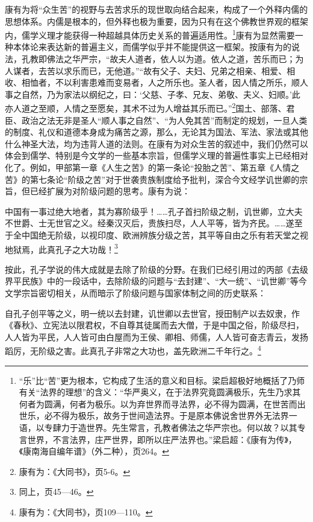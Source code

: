 \documentclass[a4paper, 12pt, openright]{ctexbook}
\renewenvironment{quote}
  {\list{}{\rightmargin2\ccwd \leftmargin2\ccwd \itemindent=2\ccwd \listparindent=2\ccwd}%
   \item\relax\small\kaishu\color{black}}
  {\endlist}
\begin{document}
康有为将“众生苦”的视野与去苦求乐的现世取向结合起来，构成了一个外释内儒的思想体系。内儒是根本的，但外释也极为重要，因为只有在这个佛教世界观的框架内，儒学义理才能获得一种超越具体历史关系的普遍适用性。\footnote{“乐”比“苦”更为根本，它构成了生活的意义和目标。梁启超极好地概括了乃师有关“法界的理想”的含义：“华严奥义，在于法界究竟圆满极乐，先生乃求其何者为圆满，何者为极乐。以为弃世界而寻法界，必不得为圆满，在世苦而出世乐，必不得为极乐，故务于世间造法界。于是原本佛说舍世界外无法界一语，以专肆力于造世界。先生常言，孔教者佛法之华严宗也。何以故？以其专言世界，不言法界，庄严世界，即所以庄严法界也。”梁启超：《康有为传》，《康南海自编年谱》（外二种），页264。}康有为显然需要一种本体论来表达新的普遍主义，而儒学似乎并不能提供这一框架。按康有为的说法，孔教即佛法之华严宗，“故夫人道者，依人以为道。依人之道，苦乐而已；为人谋者，去苦以求乐而已，无他道。”“故有父子、夫妇、兄弟之相亲、相爱、相收、相恤者，不以利害患难而变易者，人之所乐也。圣人者，因人情之所乐，顺人事之自然，乃为家法以纲纪之，曰：‘父慈、子孝、兄友、弟敬、夫义、妇顺。’此亦人道之至顺，人情之至愿矣，其术不过为人增益其乐而已。”\footnote{康有为：《大同书》，页5-6。}国土、部落、君臣、政治之法无非是圣人“顺人事之自然”、“为人免其苦”而制定的规划，一旦人类的制度、礼仪和道德本身成为痛苦之源，那么，无论其为国法、军法、家法或其他什么神圣大法，均为违背人道的法则。在康有为对众生苦的叙述中，我们仍然可以体会到儒学、特别是今文学的一些基本宗旨，但儒学义理的普遍性事实上已经相对化了。例如，甲部第一章《人生之苦》的第一条论“投胎之苦”、第五章《人情之苦》的第七条论“阶级之苦”对于世袭贵族制度给予批判，深合今文经学讥世卿的宗旨，但已经扩展为对阶级问题的思考。康有为说：

\begin{quote}
中国有一事过绝大地者，其为寡阶级乎！……孔子首扫阶级之制，讥世卿，立大夫不世爵、士无世官之义。经秦汉灭后，贵族扫尽，人人平等，皆为齐民。……遂至于全中国绝无阶级，以视印度、欧洲辨族分级之苦，其平等自由之乐有若天堂之视地狱焉，此真孔子之大功哉！\footnote{同上，页45—46。}
\end{quote}

按此，孔子学说的伟大成就是去除了阶级的分野。在我们已经引用过的丙部《去级界平民族》中的一段话中，去除阶级的问题与“去封建”、“大一统”、“讥世卿”等今文学宗旨密切相关，从而暗示了阶级问题与国家体制之间的历史联系：

\begin{quote}
自孔子创平等之义，明一统以去封建，讥世卿以去世官，授田制产以去奴隶，作《春秋》、立宪法以限君权，不自尊其徒属而去大僧，于是中国之俗，阶级尽扫，人人皆为平民，人人皆可由白屋而为王侯、卿相、师儒，人人皆可奋志青云，发扬蹈厉，无阶级之害。此真孔子非常之大功也，盖先欧洲二千年行之。\footnote{康有为：《大同书》，页109—110。}
\end{quote}
\end{document}
